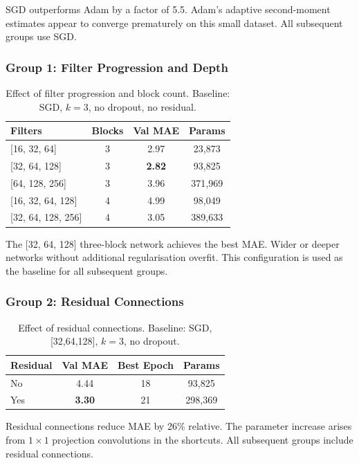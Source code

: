 \documentclass[11pt,a4paper]{article}
\begin{document}
SGD outperforms Adam by a factor of 5.5. Adam's adaptive second-moment estimates appear
to converge prematurely on this small dataset. All subsequent groups use SGD.

\subsubsection{Group 1: Filter Progression and Depth}

\begin{table}[h]
\centering
\caption{Effect of filter progression and block count. Baseline: SGD, $k=3$, no dropout, no residual.}
\begin{tabular}{lccc}
\toprule
Filters & Blocks & Val MAE & Params \\
\midrule
{[}16, 32, 64{]}       & 3 & 2.97 &  23,873 \\
{[}32, 64, 128{]}      & 3 & \textbf{2.82} &  93,825 \\
{[}64, 128, 256{]}     & 3 & 3.96 & 371,969 \\
{[}16, 32, 64, 128{]}  & 4 & 4.99 &  98,049 \\
{[}32, 64, 128, 256{]} & 4 & 3.05 & 389,633 \\
\bottomrule
\end{tabular}
\end{table}

The [32, 64, 128] three-block network achieves the best MAE. Wider or deeper networks
without additional regularisation overfit. This configuration is used as the baseline
for all subsequent groups.

\subsubsection{Group 2: Residual Connections}

\begin{table}[h]
\centering
\caption{Effect of residual connections. Baseline: SGD, [32,64,128], $k=3$, no dropout.}
\begin{tabular}{lccc}
\toprule
Residual & Val MAE & Best Epoch & Params \\
\midrule
No  & 4.44 & 18 &  93,825 \\
Yes & \textbf{3.30} & 21 & 298,369 \\
\bottomrule
\end{tabular}
\end{table}

Residual connections reduce MAE by 26\% relative. The parameter increase arises from
$1\times1$ projection convolutions in the shortcuts. All subsequent groups include
residual connections.
\end{document}
